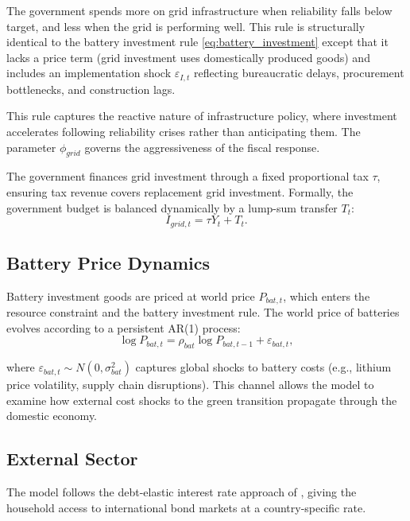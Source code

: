 	The government spends more on grid infrastructure when reliability falls below target, and less when the grid is performing well. This rule is structurally identical to the battery investment rule \eqref{eq:battery_investment} except that it lacks a price term (grid investment uses domestically produced goods) and includes an implementation shock $\varepsilon_{I,t}$ reflecting bureaucratic delays, procurement bottlenecks, and construction lags.
	
	This rule captures the reactive nature of infrastructure policy, where investment accelerates following reliability crises rather than anticipating them. The parameter $\phi_{grid}$ governs the aggressiveness of the fiscal response.
	
	The government finances grid investment through a fixed proportional tax $\tau$, ensuring tax revenue covers replacement grid investment. Formally, the government budget is balanced dynamically by a lump-sum transfer $T_t$:
	\begin{equation}
		I_{grid,t} = \tau Y_t + T_t
		\label{eq:gov_budget}.
	\end{equation}

	\subsection{Battery Price Dynamics}
	
	Battery investment goods are priced at world price $P_{bat,t}$, which enters the resource constraint and the battery investment rule. The world price of batteries evolves according to a persistent AR(1) process:
	\begin{equation}
		\log P_{bat,t} = \rho_{bat} \log P_{bat,t-1} + \varepsilon_{bat,t}
		\label{eq:battery_price_shock},
	\end{equation}
	
	where $\varepsilon_{bat,t} \sim N(0, \sigma^2_{bat})$ captures global shocks to battery costs (e.g., lithium price volatility, supply chain disruptions). This channel allows the model to examine how external cost shocks to the green transition propagate through the domestic economy.
	
	\subsection{External Sector}
	
	The model follows the debt-elastic interest rate approach of \citet{schmittgrohe2003}, giving the household access to international bond markets at a country-specific rate.

